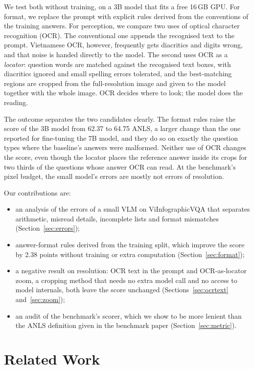 \documentclass[conference]{IEEEtran}
\begin{document}
We test both without training, on a 3B model that fits a free 16\,GB GPU. For format, we replace the prompt with explicit rules derived from the conventions of the training answers. For perception, we compare two uses of optical character recognition (OCR). The conventional one appends the recognised text to the prompt. Vietnamese OCR, however, frequently gets diacritics and digits wrong, and that noise is handed directly to the model. The second uses OCR as a \emph{locator}: question words are matched against the recognised text boxes, with diacritics ignored and small spelling errors tolerated, and the best-matching regions are cropped from the full-resolution image and given to the model together with the whole image. OCR decides where to look; the model does the reading.

The outcome separates the two candidates clearly. The format rules raise the score of the 3B model from 62.37 to 64.75 ANLS, a larger change than the one reported for fine-tuning the 7B model, and they do so on exactly the question types where the baseline's answers were malformed. Neither use of OCR changes the score, even though the locator places the reference answer inside its crops for two thirds of the questions whose answer OCR can read. At the benchmark's pixel budget, the small model's errors are mostly not errors of resolution.

Our contributions are:
\begin{itemize}
\item an analysis of the errors of a small VLM on ViInfographicVQA that separates arithmetic, misread details, incomplete lists and format mismatches (Section~\ref{sec:errors});
\item answer-format rules derived from the training split, which improve the score by 2.38 points without training or extra computation (Section~\ref{sec:format});
\item a negative result on resolution: OCR text in the prompt and OCR-as-locator zoom, a cropping method that needs no extra model call and no access to model internals, both leave the score unchanged (Sections~\ref{sec:ocrtext} and~\ref{sec:zoom});
\item an audit of the benchmark's scorer, which we show to be more lenient than the ANLS definition given in the benchmark paper (Section~\ref{sec:metric}).
\end{itemize}

\section{Related Work}
\end{document}
